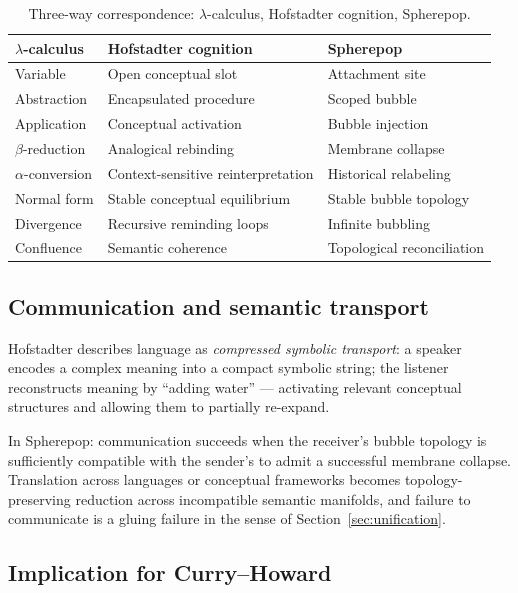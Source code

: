 \documentclass[12pt, a4paper]{article}
\theoremstyle{plain}
\theoremstyle{definition}
\theoremstyle{remark}
\begin{document}
\begin{table}[h!]
\centering
\caption{Three-way correspondence: $\lambda$-calculus, Hofstadter cognition, Spherepop.}
\label{tab:threeway}
\begin{tabular}{lll}
\toprule
\textbf{$\lambda$-calculus} & \textbf{Hofstadter cognition} & \textbf{Spherepop} \\
\midrule
Variable              & Open conceptual slot        & Attachment site \\
Abstraction           & Encapsulated procedure      & Scoped bubble \\
Application           & Conceptual activation       & Bubble injection \\
$\beta$-reduction     & Analogical rebinding        & Membrane collapse \\
$\alpha$-conversion   & Context-sensitive reinterpretation & Historical relabeling \\
Normal form           & Stable conceptual equilibrium & Stable bubble topology \\
Divergence            & Recursive reminding loops   & Infinite bubbling \\
Confluence            & Semantic coherence          & Topological reconciliation \\
\bottomrule
\end{tabular}
\end{table}

\subsection{Communication and semantic transport}

Hofstadter describes language as \emph{compressed symbolic transport}:
a speaker encodes a complex meaning into a compact symbolic string;
the listener reconstructs meaning by ``adding water'' — activating
relevant conceptual structures and allowing them to partially re-expand.

In Spherepop: communication succeeds when the receiver's bubble
topology is sufficiently compatible with the sender's to admit a
successful membrane collapse.
Translation across languages or conceptual frameworks becomes
topology-preserving reduction across incompatible semantic manifolds,
and failure to communicate is a gluing failure in the sense of
Section~\ref{sec:unification}.

\subsection{Implication for Curry--Howard}
\end{document}
